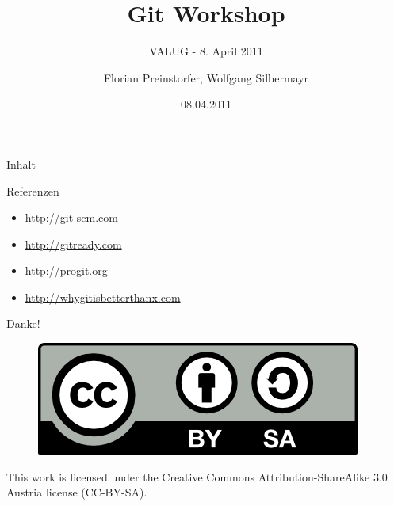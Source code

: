 \documentclass[%
]{beamer}
\title{Git Workshop}
\subtitle{VALUG - 8. April 2011}
\author[Florian Preinstorfer, Wolfgang Silbermayr]{Florian Preinstorfer, Wolfgang Silbermayr}
\date[valug - 08.04.2011]{08.04.2011}
\begin{document}
\frame[plain]{\titlepage}

\begin{frame}{Inhalt}
  \tableofcontents
\end{frame}






\begin{frame}{Referenzen}
\begin{itemize}
  \item \url{http://git-scm.com}
  \item \url{http://gitready.com}
  \item \url{http://progit.org}
  \item \url{http://whygitisbetterthanx.com}
\end{itemize}
\end{frame}

\begin{frame}[plain]
  \begin{center}
    \vspace{1cm}
    Danke!
    \vspace{3cm}
    \begin{figure}[!b]
      \includegraphics[scale=0.5]{img/by-sa}
    \end{figure}
    \tiny{This work is licensed under the Creative Commons Attribution-ShareAlike 3.0 Austria license (CC-BY-SA).}
\end{center}
\end{frame}
\end{document}
